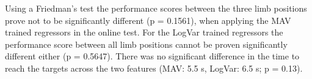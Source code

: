 \documentclass[landscape,a0paper,fontscale=0.375]{baposter} %
\begin{document}
\begin{poster}
{Using a Friedman's test the performance scores between the three limb positions prove not to be significantly different (p = 0.1561), when applying the MAV trained regressors in the online test. For the LogVar trained regressors the performance score between all limb positions cannot be proven significantly different either (p = 0.5647). There was no significant difference in the time to reach the targets across the two features (MAV: 5.5 s, LogVar: 6.5 s; p = 0.13).

}


\end{poster}
\end{document}
